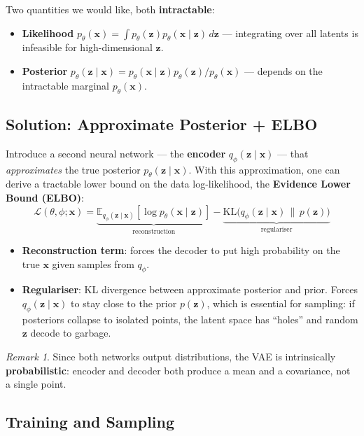 \documentclass[11pt,a4paper]{article}
\theoremstyle{definition}
\theoremstyle{plain}
\theoremstyle{remark}
\newtheorem*{remark}{Remark}
\begin{document}
Two quantities we would like, both \textbf{intractable}:
\begin{itemize}
    \item \textbf{Likelihood} $p_\theta(\mathbf{x}) = \int p_\theta(\mathbf{z}) p_\theta(\mathbf{x}\mid\mathbf{z})\, d\mathbf{z}$ --- integrating over all latents is infeasible for high-dimensional $\mathbf{z}$.
    \item \textbf{Posterior} $p_\theta(\mathbf{z}\mid\mathbf{x}) = p_\theta(\mathbf{x}\mid\mathbf{z}) p_\theta(\mathbf{z}) / p_\theta(\mathbf{x})$ --- depends on the intractable marginal $p_\theta(\mathbf{x})$.
\end{itemize}

\subsection{Solution: Approximate Posterior + ELBO}

Introduce a second neural network --- the \textbf{encoder} $q_\phi(\mathbf{z}\mid\mathbf{x})$ --- that \emph{approximates} the true posterior $p_\theta(\mathbf{z}\mid\mathbf{x})$. With this approximation, one can derive a tractable lower bound on the data log-likelihood, the \textbf{Evidence Lower Bound (ELBO)}:
\[
    \mathcal{L}(\theta, \phi; \mathbf{x}) = \underbrace{\mathbb{E}_{q_\phi(\mathbf{z}\mid\mathbf{x})}[\log p_\theta(\mathbf{x}\mid\mathbf{z})]}_{\text{reconstruction}} - \underbrace{\mathrm{KL}\bigl(q_\phi(\mathbf{z}\mid\mathbf{x}) \,\|\, p(\mathbf{z})\bigr)}_{\text{regulariser}}
\]
\begin{itemize}
    \item \textbf{Reconstruction term}: forces the decoder to put high probability on the true $\mathbf{x}$ given samples from $q_\phi$.
    \item \textbf{Regulariser}: KL divergence between approximate posterior and prior. Forces $q_\phi(\mathbf{z}\mid\mathbf{x})$ to stay close to the prior $p(\mathbf{z})$, which is essential for sampling: if posteriors collapse to isolated points, the latent space has ``holes'' and random $\mathbf{z}$ decode to garbage.
\end{itemize}

\begin{remark}
Since both networks output distributions, the VAE is intrinsically \textbf{probabilistic}: encoder and decoder both produce a mean and a covariance, not a single point.
\end{remark}

\subsection{Training and Sampling}
\end{document}
